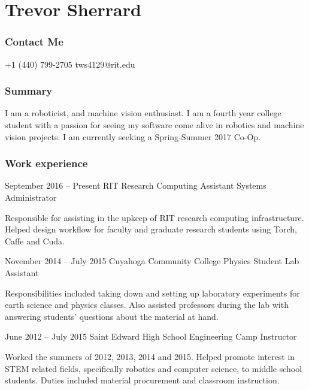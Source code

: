 \documentclass{tccv}
\begin{document}
\part{Trevor Sherrard}
\section{Contact Me}
\begin{eventlist}
    {+1 (440) 799-2705}
    {tws4129@rit.edu}
    
\end{eventlist}

\section{Summary}
I am a roboticist, and machine vision enthusiast. I am a fourth year college student with a passion for seeing my software come alive in robotics and machine vision projects. I am currently seeking a Spring-Summer 2017 Co-Op.

\section{Work experience}

\begin{eventlist}

\item{September 2016 -- Present}
	 {RIT Research Computing}
	 {Assistant Systems Administrator}
	 
Responsible for assisting in the upkeep of RIT research computing infrastructure. Helped design workflow for faculty and graduate research students using Torch, Caffe and Cuda.  


\item{November 2014 -- July 2015}
     {Cuyahoga Community College}
     {Physics Student Lab Assistant }

Responsibilities included taking down and setting up laboratory experiments for earth science and physics classes. Also assisted professors during the lab with answering students' questions about the material at hand.

\item{June 2012 -- July 2015}
     {Saint Edward High School}
     {Engineering Camp Instructor}
     
Worked the summers of 2012, 2013, 2014 and 2015. Helped promote interest in STEM related fields, specifically robotics and computer science, to middle school students. Duties included material procurement and classroom instruction.
\end{eventlist}
\end{document}
